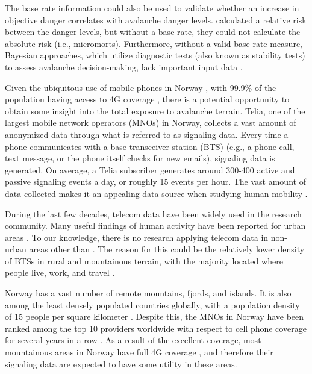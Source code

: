 \documentclass[authordate,empirical, issue]{jote-new-article}
\begin{document}
The base rate information could also be used to validate whether an increase in objective danger correlates with avalanche danger levels. \textcite{Winkler2021} calculated a relative risk between the danger levels, but without a base rate, they could not calculate the absolute risk (i.e., micromorts). Furthermore, without a valid base rate measure, Bayesian approaches, which utilize diagnostic tests (also known as stability tests) to assess avalanche decision-making, lack important input data \parencites{Ebert2019}{Techel2020}.







Given the ubiquitous use of mobile phones in Norway \parencites{Statista2021}, with 99.9\% of the population having access to 4G coverage \parencites{MLGM2021}, there is a potential opportunity to obtain some insight into the total exposure to avalanche terrain. Telia, one of the largest mobile network operators (MNOs) in Norway, collects a vast amount of anonymized data through what is referred to as signaling data. Every time a phone communicates with a base transceiver station (BTS) (e.g., a phone call, text message, or the phone itself checks for new emails), signaling data is generated. On average, a Telia subscriber generates around 300-400 active and passive signaling events a day, or roughly 15 events per hour. The vast amount of data collected makes it an appealing data source when studying human mobility \parencites{Zhao2016}.







During the last few decades, telecom data have been widely used in the research community. Many useful findings of human activity have been reported for urban areas \parencites{González2008}{Song2010}. To our knowledge, there is no research applying telecom data in non-urban areas other than \textcite{Francisco2018}. The reason for this could be the relatively lower density of BTSs in rural and mountainous terrain, with the majority located where people live, work, and travel \parencites{Zhao2016}.







Norway has a vast number of remote mountains, fjords, and islands. It is also among the least densely populated countries globally, with a population density of 15 people per square kilometer \parencites{UN2021}. Despite this, the MNOs in Norway have been ranked among the top 10 providers worldwide with respect to cell phone coverage for several years in a row \parencites{Speedtest2021}. As a result of the excellent coverage, most mountainous areas in Norway have full 4G coverage \parencites{Telenor2021}{Telia2021}, and therefore their signaling data are expected to have some utility in these areas.
\end{document}
